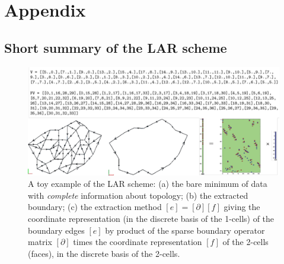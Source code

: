 \appendix
\section{Appendix}
\subsection{Short summary of the LAR scheme}\label{lar}


\begin{figure}[!htbp] %
 \centering
 \includegraphics[width=\linewidth]{images/minimum} 
 \caption{A toy example of the LAR scheme: (a) the bare minimum of data with \emph{complete} information about topology; (b) the extracted boundary; (c) the extraction method $[e] = [\partial][f]$ giving the coordinate representation (in the discrete basis of the 1-cells) of the boundary edges $[e]$ by product of the sparse boundary operator matrix $[\partial]$ times the coordinate representation $[f]$ of the 2-cells (faces), in the discrete basis of the 2-cells.}
 \label{fig:minimum}
\end{figure}

